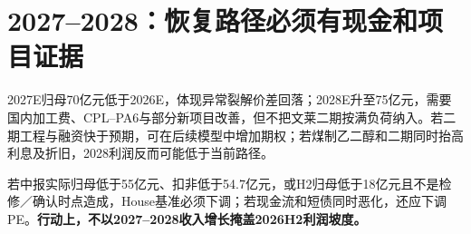 \section{2027--2028：恢复路径必须有现金和项目证据}

2027E归母70亿元低于2026E，体现异常裂解价差回落；2028E升至75亿元，需要国内加工费、CPL--PA6与部分新项目改善，但不把文莱二期按满负荷纳入。若二期工程与融资快于预期，可在后续模型中增加期权；若煤制乙二醇和二期同时抬高利息及折旧，2028利润反而可能低于当前路径。

\begin{riskbox}[预测失效条件]
若中报实际归母低于55亿元、扣非低于54.7亿元，或H2归母低于18亿元且不是检修／确认时点造成，House基准必须下调；若现金流和短债同时恶化，还应下调PE。\textbf{行动上，不以2027--2028收入增长掩盖2026H2利润坡度。}
\end{riskbox}

